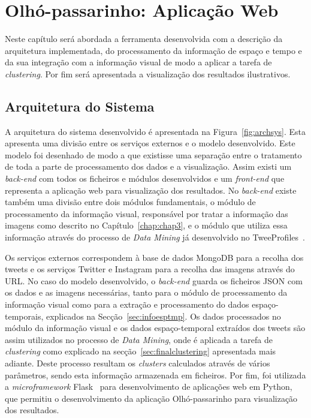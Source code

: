 \chapter{Olhó-passarinho: Aplicação Web}\label{chap:chap4}

Neste capítulo será abordada a ferramenta desenvolvida com a descrição da arquitetura implementada, do processamento da informação de espaço e tempo e da sua integração com a informação visual de modo a aplicar a tarefa de \textit{clustering}. Por fim será apresentada a visualização dos resultados ilustrativos.

\section{Arquitetura do Sistema}

A arquitetura do sistema desenvolvido é apresentada na Figura~\ref{fig:archsys}. Esta apresenta uma divisão entre os serviços externos e o modelo desenvolvido. Este modelo foi desenhado de modo a que existisse uma separação entre o tratamento de toda a parte de processamento dos dados e a visualização. Assim existi um \textit{back-end} com todos os ficheiros e módulos desenvolvidos e um \textit{front-end} que representa a aplicação web para visualização dos resultados. No \textit{back-end} existe também uma divisão entre dois módulos fundamentais, o módulo de processamento da informação visual, responsável por tratar a informação das imagens como descrito no Capítulo~\ref{chap:chap3}, e o módulo que utiliza essa informação através do processo de \textit{Data Mining} já desenvolvido no TweeProfiles~\cite{Cunha2013}.


Os serviços externos correspondem à base de dados MongoDB para a recolha dos tweets e os serviços Twitter e Instagram para a recolha das imagens através do URL. No caso do modelo desenvolvido, o \textit{back-end} guarda os ficheiros JSON com os dados e as imagens necessárias, tanto para o módulo de processamento da informação visual como para a extração e processamento do dados espaço-temporais, explicados na Secção~\ref{sec:infoesptmp}. Os dados processados no módulo da informação visual e os dados espaço-temporal extraídos dos tweets são assim utilizados no processo de \textit{Data Mining}, onde é aplicada a tarefa de \textit{clustering} como explicado na secção~\ref{sec:finalclustering} apresentada mais adiante. Deste processo resultam os \textit{clusters} calculados através de vários parâmetros, sendo esta informação armazenada em ficheiros. Por fim, foi utilizada a \textit{microframework} Flask~\cite{flask} para desenvolvimento de aplicações web em Python, que permitiu o desenvolvimento da aplicação Olhó-passarinho para visualização dos resultados. 

